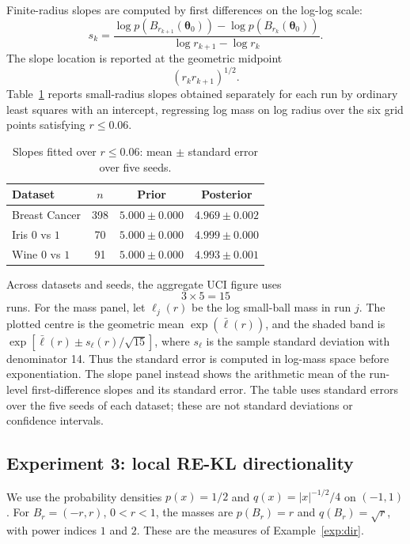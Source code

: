 \documentclass[11pt,a4paper]{article}
\newcommand{\pa}{\boldsymbol\theta}
\theoremstyle{compactplain}
\theoremstyle{compactdefinition}
\numberwithin{equation}{section}
\begin{document}
Finite-radius slopes are computed by first differences on the log-log scale:
\[
s_k
=
\frac{
\log p(B_{r_{k+1}}(\pa_0))
-
\log p(B_{r_k}(\pa_0))
}{
\log r_{k+1}-\log r_k
}.
\]
The slope location is reported at the geometric midpoint
\[
(r_k r_{k+1})^{1/2}.
\]
Table~\ref{tab:uci_slopes} reports small-radius slopes obtained separately
for each run by ordinary least squares with an intercept, regressing log
mass on log radius over the six grid points satisfying \(r\leq0.06\).

\begin{table}[htbp]
\centering\small
\caption{Slopes fitted over \(r\le0.06\): mean \(\pm\) standard error over five seeds.}
\label{tab:uci_slopes}
\setlength{\tabcolsep}{3pt}
\begin{tabular}{lccc}
\toprule
Dataset & \(n\) & Prior & Posterior \\
\midrule
Breast Cancer & 398 & \(5.000\pm0.000\) & \(4.969\pm0.002\) \\
Iris \(0\) vs \(1\) & 70 & \(5.000\pm0.000\) & \(4.999\pm0.000\) \\
Wine \(0\) vs \(1\) & 91 & \(5.000\pm0.000\) & \(4.993\pm0.001\) \\
\bottomrule
\end{tabular}
\end{table}

Across datasets and seeds, the aggregate UCI figure uses
\[
3\times5=15
\]
runs.
For the mass panel, let \(\ell_j(r)\) be the log small-ball mass in run
\(j\). The plotted centre is the geometric mean \(\exp(\bar\ell(r))\),
and the shaded band is
\(\exp[\bar\ell(r)\pm s_\ell(r)/\sqrt{15}]\), where \(s_\ell\) is the
sample standard deviation with denominator 14. Thus the standard error
is computed in log-mass space before exponentiation. The slope panel
instead shows the arithmetic mean of the run-level first-difference
slopes and its standard error. The table uses standard errors over the
five seeds of each dataset; these are not standard deviations or
confidence intervals.

\subsection{Experiment 3: local RE-KL directionality}
\label{app:rekl_directionality}

We use the probability densities \(p(x)=1/2\) and \(q(x)=|x|^{-1/2}/4\) on \((-1,1)\). For \(B_r=(-r,r)\), \(0<r<1\), the masses are \(p(B_r)=r\) and \(q(B_r)=\sqrt r\), with power indices \(1\) and \(2\). These are the measures of Example~\ref{exp:dir}.
\end{document}
